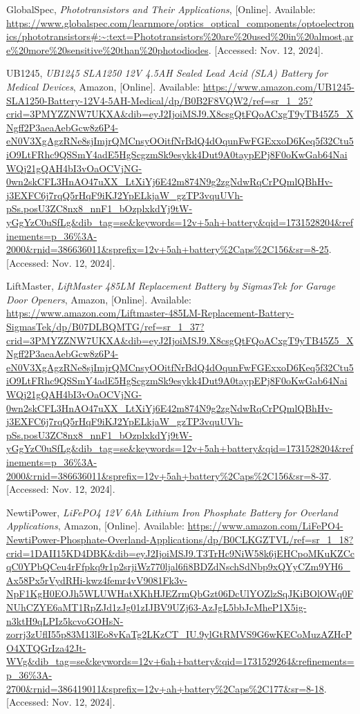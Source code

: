 \begin{thebibliography}{45}
	GlobalSpec, \textit{Phototransistors and Their Applications}, [Online]. Available: \url{https://www.globalspec.com/learnmore/optics_optical_components/optoelectronics/phototransistors#:~:text=Phototransistors%20are%20used%20in%20almost,are%20more%20sensitive%20than%20photodiodes}. [Accessed: Nov. 12, 2024].
	
	UB1245, \textit{UB1245 SLA1250 12V 4.5AH Sealed Lead Acid (SLA) Battery for Medical Devices}, Amazon, [Online]. Available: \url{https://www.amazon.com/UB1245-SLA1250-Battery-12V4-5AH-Medical/dp/B0B2F8VQW2/ref=sr_1_25?crid=3PMYZZNW7UKXA&dib=eyJ2IjoiMSJ9.X8csgQtFQoACxgT9yTB45Z5_XNgff2P3aeaAebGcw8z6P4-eN0V3XgAgzRNe8sjImjrQMCnsyOOitfNrBdQ4dOqunFwFGExxoD6Keq5f32Ctu5iO9LtFRhc9QSSmY4adE5HgScgzmSk9esykk4Dut9A0taypEPj8F0oKwGab64NaiWQj21gQAH4bI3vOaOCVjNG-0wn2skCFL3HnAO47uXX_LtXiYj6E42m874N9g2zgNdwRqCrPQmlQBhHv-j3EXFC6j7rqQ5rHqF9iKJ2YpELkjaW_gzTP3vquUVh-pSs.posU3ZC8nx8_nnF1_bOzplxkdYj9tW-yGgYzC0uSfLg&dib_tag=se&keywords=12v+5ah+battery&qid=1731528204&refinements=p_36%3A-2000&rnid=386636011&sprefix=12v+5ah+battery%2Caps%2C156&sr=8-25}. [Accessed: Nov. 12, 2024].
	
	LiftMaster, \textit{LiftMaster 485LM Replacement Battery by SigmasTek for Garage Door Openers}, Amazon, [Online]. Available: \url{https://www.amazon.com/Liftmaster-485LM-Replacement-Battery-SigmasTek/dp/B07DLBQMTG/ref=sr_1_37?crid=3PMYZZNW7UKXA&dib=eyJ2IjoiMSJ9.X8csgQtFQoACxgT9yTB45Z5_XNgff2P3aeaAebGcw8z6P4-eN0V3XgAgzRNe8sjImjrQMCnsyOOitfNrBdQ4dOqunFwFGExxoD6Keq5f32Ctu5iO9LtFRhc9QSSmY4adE5HgScgzmSk9esykk4Dut9A0taypEPj8F0oKwGab64NaiWQj21gQAH4bI3vOaOCVjNG-0wn2skCFL3HnAO47uXX_LtXiYj6E42m874N9g2zgNdwRqCrPQmlQBhHv-j3EXFC6j7rqQ5rHqF9iKJ2YpELkjaW_gzTP3vquUVh-pSs.posU3ZC8nx8_nnF1_bOzplxkdYj9tW-yGgYzC0uSfLg&dib_tag=se&keywords=12v+5ah+battery&qid=1731528204&refinements=p_36%3A-2000&rnid=386636011&sprefix=12v+5ah+battery%2Caps%2C156&sr=8-37}. [Accessed: Nov. 12, 2024].
	
	NewtiPower, \textit{LiFePO4 12V 6Ah Lithium Iron Phosphate Battery for Overland Applications}, Amazon, [Online]. Available: \url{https://www.amazon.com/LiFePO4-NewtiPower-Phosphate-Overland-Applications/dp/B0CLKGZTVL/ref=sr_1_18?crid=1DAII15KD4DBK&dib=eyJ2IjoiMSJ9.T3TrHc9NiW58k6jEHCpoMKuKZCcqC0YPbQCeu4rFfpkq9r1p2srjiWz770ljal6fi8BDZdNschSdNbp9xQYyCZm9YH6_Ax58Px5rVydRHi-kwz4femr4vV9081Fk3v-NpF1KgH0EOJh5WLUWHatXKhHJEZrmQbGzt06DcUlYOZlzSqJKiBOlOWq0FNUhCZYE6aMT1RpZJd1zJg01zIJBV9UZj63-AzJgL5bbJcMheP1X5ig-n3ktH9qLPIz5kcvoGOHsN-zorrj3zUflI55p83M13lEo8vKaTg2LKzCT_IU.9ylGtRMVS9G6wKECoMuzAZHcPO4XTQGrIza42Jt-WVg&dib_tag=se&keywords=12v+6ah+battery&qid=1731529264&refinements=p_36%3A-2700&rnid=386419011&sprefix=12v+ah+battery%2Caps%2C177&sr=8-18}. [Accessed: Nov. 12, 2024].
	

\end{thebibliography}
